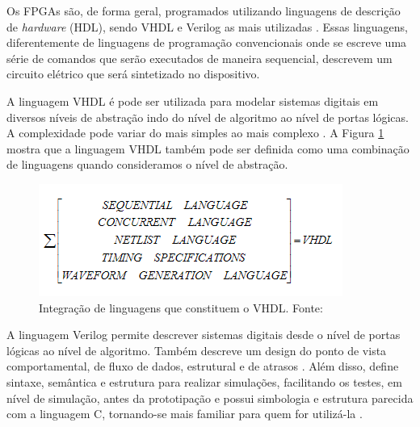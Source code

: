 Os FPGAs são, de forma geral, programados utilizando linguagens de descrição de \textit{hardware} (HDL), sendo VHDL e Verilog as mais utilizadas \cite{Ain}. Essas linguagens, diferentemente de linguagens de programação convencionais onde se escreve uma série de comandos que serão executados de maneira sequencial, descrevem um circuito elétrico que será sintetizado no dispositivo.

A linguagem VHDL é pode ser utilizada para modelar sistemas digitais em diversos níveis de abstração indo do nível de algoritmo ao nível de portas lógicas. A complexidade pode variar do mais simples ao mais complexo \cite{Wunnava}. A Figura \ref{fig:Vhdl} mostra que a linguagem VHDL também pode ser definida como uma combinação de linguagens quando consideramos o nível de abstração.

\begin{figure}[H]
    \centering
    \includegraphics[scale=0.8]{figures/ReferencialTeorico/Vhdl.png}
    \caption{Integração de linguagens que constituem o VHDL. Fonte: \cite{Wunnava}}
    \label{fig:Vhdl}
\end{figure}


A linguagem Verilog permite descrever sistemas digitais desde o nível de portas lógicas ao nível de algoritmo. Também descreve um design do ponto de vista comportamental, de fluxo de dados, estrutural e de atrasos \cite{Bhasker}. Além disso, define sintaxe, semântica e estrutura para realizar simulações, facilitando os testes, em nível de simulação, antes da prototipação e possui simbologia e estrutura parecida com a linguagem C, tornando-se mais familiar para quem for utilizá-la \cite{Wunnava}.
